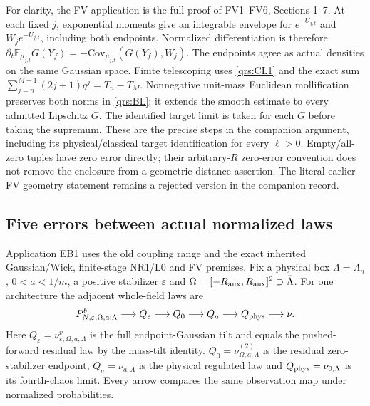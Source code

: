 \documentclass[11pt]{article}
\theoremstyle{plain}
\theoremstyle{definition}
\theoremstyle{remark}
\newcommand{\E}{\mathbb{E}}
\begin{document}
For clarity, the FV application is the full proof of FV1--FV6, Sections
1--7. At each fixed $j$, exponential moments give an integrable envelope
for $e^{-U_{j,t}}$ and $W_je^{-U_{j,t}}$, including both endpoints.
Normalized differentiation is therefore
$\partial_t\E_{\mu_{j,t}}G(Y_f)=-\mathrm{Cov}_{\mu_{j,t}}(G(Y_f),W_j)$.
The endpoints agree as actual densities on the same Gaussian space.
Finite telescoping uses \eqref{qrs:CL1} and the exact sum
$\sum_{j=n}^{M-1}(2j+1)q^j=T_n-T_M$.
Nonnegative unit-mass Euclidean mollification preserves both norms in
\eqref{qrs:BL}; it extends the smooth estimate to every admitted Lipschitz
$G$. The identified target limit is taken for each $G$ before taking the
supremum. These are the precise steps in the companion argument, including
its physical/classical target identification for every $\ell>0$.
Empty/all-zero tuples have zero error directly; their arbitrary-$R$
zero-error convention does not remove the enclosure from a geometric
distance assertion. The literal earlier FV geometry statement remains a
rejected version in the companion record.

\subsection{Five errors between actual normalized laws}
\label{qrs:budget}

Application EB1 uses the old coupling range and the exact inherited
Gaussian/Wick, finite-stage NR1/L0 and FV premises. Fix a physical box
$\Lambda=\Lambda_n$, $0<a<1/m$, a positive stabilizer $\varepsilon$ and
$\Omega=[-R_{\rm aux},R_{\rm aux}]^2\supset\bar\Lambda$.
For one architecture the adjacent whole-field laws are
\begin{equation}\label{qrs:chain}
 P^b_{N,\varepsilon,\Omega,a;\Lambda}
 \longrightarrow Q_\varepsilon\longrightarrow Q_0
 \longrightarrow Q_a\longrightarrow Q_{\rm phys}
 \longrightarrow \nu.
\end{equation}
Here $Q_\varepsilon=\nu^v_{\varepsilon,\Omega,a;\Lambda}$ is the full
endpoint-Gaussian tilt and equals the pushed-forward residual law by the
mass-tilt identity. $Q_0=\nu^{(2)}_{\Omega,a;\Lambda}$ is the residual
zero-stabilizer endpoint, $Q_a=\nu_{a,\Lambda}$ is the physical regulated
law and $Q_{\rm phys}=\nu_{0,\Lambda}$ is its fourth-chaos limit. Every
arrow compares the same observation map under normalized probabilities.
\end{document}
